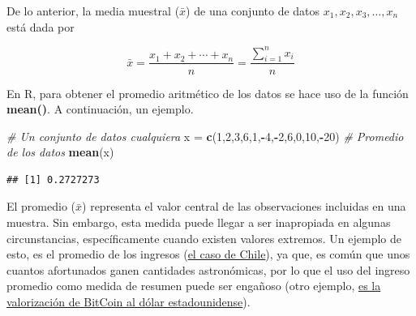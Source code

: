 \documentclass[
  11pt,
]{book}
\newenvironment{Shaded}{\begin{snugshade}}{\end{snugshade}}
\newcommand{\CommentTok}[1]{\textcolor[rgb]{0.56,0.35,0.01}{\textit{#1}}}
\newcommand{\DecValTok}[1]{\textcolor[rgb]{0.00,0.00,0.81}{#1}}
\newcommand{\FunctionTok}[1]{\textcolor[rgb]{0.13,0.29,0.53}{\textbf{#1}}}
\newcommand{\NormalTok}[1]{#1}
\newcommand{\OtherTok}[1]{\textcolor[rgb]{0.56,0.35,0.01}{#1}}
\newcommand{\SpecialCharTok}[1]{\textcolor[rgb]{0.81,0.36,0.00}{\textbf{#1}}}
\theoremstyle{definition}
\theoremstyle{definition}
\theoremstyle{definition}
\theoremstyle{definition}
\theoremstyle{remark}
\begin{document}
De lo anterior, la media muestral (\(\bar{x}\)) de una conjunto de datos \(x_1, x_2, x_3, \ldots, x_n\) está dada por \citep[página 25]{Devore}

\begin{equation}
\bar{x} = \frac{x_1 + x_2 + \cdots + x_n}{n} = \frac{\displaystyle\sum_{i=1}^{n}x_i}{n}
\label{eq:promedio}
\end{equation}

En R, para obtener el promedio aritmético de los datos se hace uso de la función \textbf{mean()}. A continuación, un ejemplo.

\begin{Shaded}
\begin{Highlighting}[]
\CommentTok{\# Un conjunto de datos cualquiera}
\NormalTok{x }\OtherTok{=} \FunctionTok{c}\NormalTok{(}\DecValTok{1}\NormalTok{,}\DecValTok{2}\NormalTok{,}\DecValTok{3}\NormalTok{,}\DecValTok{6}\NormalTok{,}\DecValTok{1}\NormalTok{,}\SpecialCharTok{{-}}\DecValTok{4}\NormalTok{,}\SpecialCharTok{{-}}\DecValTok{2}\NormalTok{,}\DecValTok{6}\NormalTok{,}\DecValTok{0}\NormalTok{,}\DecValTok{10}\NormalTok{,}\SpecialCharTok{{-}}\DecValTok{20}\NormalTok{)}
\CommentTok{\# Promedio de los datos}
\FunctionTok{mean}\NormalTok{(x)}
\end{Highlighting}
\end{Shaded}

\begin{verbatim}
## [1] 0.2727273
\end{verbatim}

El promedio (\(\bar{x}\)) representa el valor central de las observaciones incluidas en una muestra. Sin embargo, esta medida puede llegar a ser inapropiada en algunas circunstancias, específicamente cuando existen valores extremos. Un ejemplo de esto, es el promedio de los ingresos (\href{https://www.ine.gob.cl/prensa/detalle-prensa/2022/07/21/el-ingreso-laboral-promedio-mensual-en-chile-fue-de-$681.039-en-2021\#:~:text=El\%20ingreso\%20laboral\%20promedio\%20mensual\%20en\%20Chile\%20fue\%20de\%20\%24681.039\%20en\%202021,-21\%2F07\%2F2022&text=El\%2050\%25\%20de\%20las\%20personas,ingreso\%20de\%20hasta\%20\%24457.690\%20mensuales.}{el caso de Chile}), ya que, es común que unos cuantos afortunados ganen cantidades astronómicas, por lo que el uso del ingreso promedio como medida de resumen puede ser engañoso (otro ejemplo, \href{https://www.google.com/finance/quote/BTC-USD?sa=X&ved=2ahUKEwi3po-_m9n8AhWUL7kGHTNFCfYQ-fUHegQIFhAe&window=MAX}{es la valorización de BitCoin al dólar estadounidense}).
\end{document}
